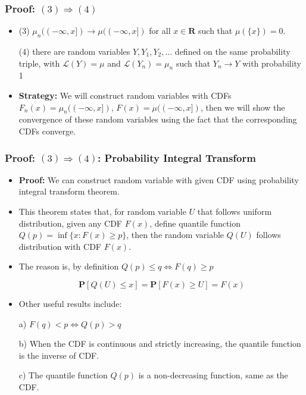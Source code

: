 \documentclass[handout]{beamer}
\newcommand{\BP}{\mathbf{P}}
\begin{document}
\frame
{
  \frametitle{Proof: $(3) \Rightarrow (4)$ } 

   \begin{itemize}

\item<1-> (3) $\mu_n((-\infty, x])\rightarrow \mu((-\infty, x])$ for all $x\in \mathbf{R}$ such that $\mu(\{x\})=0$.
                                            \vspace{2mm}

              {\color{blue}  (4) there are random variables $Y, Y_1, Y_2, \ldots$ defined on the same probability triple, with $\mathcal{L} (Y)=\mu$ and $\mathcal{L} (Y_n)=\mu_n $ such that $Y_n\rightarrow Y$ with probability 1 }
                                                           \vspace{2mm}

               
\item<2-> \textbf{Strategy:}  We will construct random variables with CDFs $F_n(x)=\mu_n((-\infty, x])$, $F(x)=\mu((-\infty, x])$, then we will show the convergence of these random variables using the fact that the corresponding CDFs converge.
                     
\end{itemize}
}

\frame
{
  \frametitle{Proof: $(3) \Rightarrow (4)$:  Probability Integral Transform} 

\begin{itemize}

\item<1-> \textbf{Proof:} We can construct random variable with given CDF using probability integral transform theorem. 
                       
\item<2-> This theorem states that,  for random variable $U$ that follows uniform distribution, given any CDF $F(x)$, define quantile function $Q(p)=\inf \{x: F(x) \geq p\}$, then the random variable $Q(U)$ follows distribution with CDF $F(x)$. 
        
\item<3->[-] The reason is, by definition $Q(p)\leq q \Leftrightarrow F(q)\geq p$
                     
                                          $$\BP[Q(U)\leq x] =\BP [F(x) \geq U]=F(x)$$
                                          
\item<4->[-] Other useful results include: 
                       
                      a) $F(q)< p \Leftrightarrow Q(p)> q $

                       
                       b) When the CDF is continuous and strictly increasing, the quantile function is the inverse of CDF.  
                       
                       
                       c) The quantile function $Q(p)$ is a non-decreasing function, same as the CDF.
                       
                                               \end{itemize}
}
\end{document}
